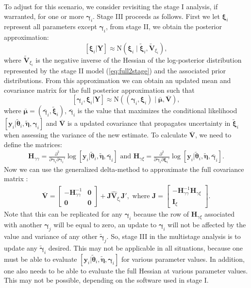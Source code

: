 \documentclass[12pt]{article}
\newcommand{\by}{\mathbf{y}}
\newcommand{\bt}{\boldsymbol{\theta}}
\newcommand{\bn}{\boldsymbol{\eta}}
\newcommand{\bg}{\boldsymbol{\gamma}}
\newcommand{\bm}{\boldsymbol{\mu}}
\newcommand{\bxi}{\boldsymbol{\xi}}
\newcommand{\bV}{\mathbf{V}}
\newcommand{\tN}{\text{N}}
\newcommand{\bY}{\mathbf{Y}}
\newcommand{\bz}{\mathbf{0}}
\begin{document}
To adjust for this scenario, we consider revisiting the stage I analysis, if warranted, for one or more $\bg_i$. Stage III proceeds as follows. First we let $\bxi_i$ represent all parameters except $\bg_i$, from stage II, we obtain the posterior approximation:
\[
[\bxi_i|\bY] \approx \tN(\bxi_i\mid \tilde{\bxi}_i, \widetilde{\bV}_{\xi_i}),
\]  
where $\widetilde{\bV}_{\xi_i}$ is the negative inverse of the Hessian of the log-posterior distribution represented by the stage II model (\ref{eq:full2stage}) and the associated prior distributions. From this approximation we can obtain an updated mean and covariance matrix for the full posterior approximation such that
\[
[\bg_i ,\bxi_i|\bY] \approx \tN((\bg_i ,\bxi_i) \mid \bar{\bm}, \overline{\bV}),
\]
where $\bar{\bm} = (\bar{\bg}_i,\tilde{\bxi}_i)$, $\bar{\bg}_i$ is the value that maximizes the conditional likelihood $[\by_i|\tilde{\bt}_i, \tilde{\bn}, \bg_i]$ and $\overline{\bV}$ is a updated covariance that propagates uncertainty in $\tilde{\bxi}_i$ when assessing the variance of the new estimate. To calculate $\overline{\bV}$, we need to define the matrices: 
\[
\begin{gathered}
\mathbf{H}_{\gamma\gamma} = \frac{\partial^2}{\partial \bg_i \partial \bg_i'} \log[\by_i|\tilde{\bt}_i, \tilde{\bn}, \bar{\bg}_i] 
\text{ and }
\mathbf{H}_{\gamma\xi} = \frac{\partial^2}{\partial \bg_i \partial \bxi_i'} \log[\by_i|\tilde{\bt}_i, \tilde{\bn}, \bar{\bg}_i].
\end{gathered}
\] 
Now we can use the generalized delta-method to approximate the full covariance matrix \citep{kass1989approximate, skaug2006automatic}:
\[
\begin{gathered}
\overline{\bV} = \left[\begin{array}{cc} -\mathbf{H}_{\gamma\gamma}^{-1} & \bz \\ \bz & \bz \end{array}\right] + 
\mathbf{J} \widehat{\bV}_{\xi_i} \mathbf{J}',  \text{ where } 
\mathbf{J} = \left[ \begin{array}{c} -\mathbf{H}_{\gamma\gamma}^{-1}\mathbf{H}_{\gamma\xi} \\ \mathbf{I}_{\xi} \end{array}\right].
\end{gathered}
\]
Note that this can be replicated for any $\bg_i$ because the row of $\mathbf{H}_{\gamma\xi}$ associated with another $\bg_j$ will be equal to zero, an update to $\bg_i$ will not be affected by the value and variance of any other $\tilde{\bg}_j$. So, stage III in the multistage analysis is to update any $\tilde{\bg}_i$ desired. This may not be applicable in all situations, because one must be able to evaluate $[\by_i|\tilde{\bt}_i, \tilde{\bn}, \bg_i]$ for various parameter values. In addition, one also needs to be able to evaluate the full Hessian at various parameter values. This may not be possible, depending on the software used in stage I. 
\end{document}
